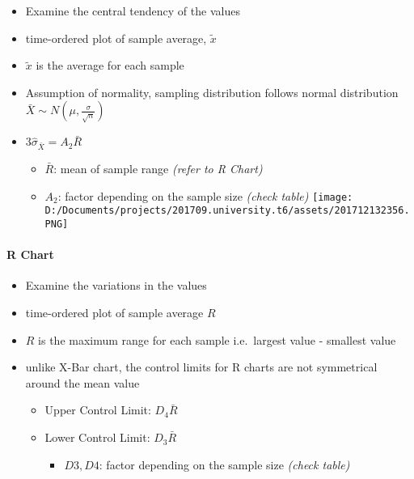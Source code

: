 \documentclass[11pt]{article}
\makeatletter
\def\maxwidth{\ifdim\Gin@nat@width>\linewidth\linewidth
    \else\Gin@nat@width\fi}
\let\Oldincludegraphics\includegraphics
\renewcommand{\includegraphics}[1]{\Oldincludegraphics[width=.8\maxwidth]{#1}}
\providecommand{\tightlist}{%
      \setlength{\itemsep}{0pt}\setlength{\parskip}{0pt}}
\makeatother
\begin{document}
\begin{itemize}
\tightlist
\item
  Examine the central tendency of the values
\item
  time-ordered plot of sample average, \(\tilde x\)
\item
  \(\tilde x\) is the average for each sample
\item
  Assumption of normality, sampling distribution follows normal
  distribution \(\bar X\sim N\left(\mu,\frac{\sigma}{\sqrt{n}}\right)\)
\item
  \(3\hat\sigma_{\bar X}=A_2\bar R\)

  \begin{itemize}
  \tightlist
  \item
    \(\bar R\): mean of sample range \emph{(refer to R Chart)}
  \item
    \(A_2\): factor depending on the sample size \emph{(check table)}
    \texttt{[image: D:/Documents/projects/201709.university.t6/assets/201712132356.PNG]}
  \end{itemize}
\end{itemize}

\hypertarget{r-chart}{%
\paragraph{R Chart}\label{r-chart}}

\begin{itemize}
\tightlist
\item
  Examine the variations in the values
\item
  time-ordered plot of sample average \(R\)
\item
  \(R\) is the maximum range for each sample i.e.~largest value -
  smallest value
\item
  unlike X-Bar chart, the control limits for R charts are not
  symmetrical around the mean value

  \begin{itemize}
  \tightlist
  \item
    Upper Control Limit: \(D_4\bar R\)
  \item
    Lower Control Limit: \(D_3\bar R\)

    \begin{itemize}
    \tightlist
    \item
      \(D3,D4\): factor depending on the sample size \emph{(check
      table)}
    \end{itemize}
  \end{itemize}
\end{itemize}
\end{document}
